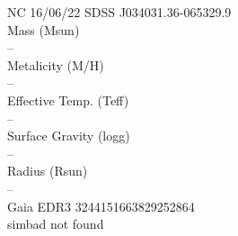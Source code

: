 NC 16/06/22
SDSS J034031.36-065329.9\\

Mass (Msun)\\
--\\
Metalicity (M/H)\\
--\\
Effective Temp. (Teff)\\
--\\
Surface Gravity (logg)\\
--\\
Radius (Rsun)\\
--\\

Gaia EDR3 3244151663829252864\\
simbad not found\\